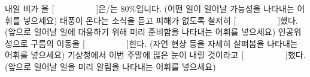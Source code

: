 \documentclass[fs11,seriesFre]{korfarm-base}
\begin{document}
\clearpage

\begin{kfChapterAreaList}
\end{kfChapterAreaList}



\kfActivityBg \par{}\par\nopagebreak[4]\smallskip\nopagebreak[4]
\begin{kfBlankList}
\kfBlankItem 내일 비가 올 [　　　　　]은/는 80\%입니다. (어떤 일이 일어날 가능성을 나타내는 어휘를 넣으세요)
\kfBlankItem 태풍이 온다는 소식을 듣고 피해가 없도록 철저히 [　　　　　]했다. (앞으로 일어날 일에 대응하기 위해 미리 준비함을 나타내는 어휘를 넣으세요)
\kfBlankItem 인공위성으로 구름의 이동을 [　　　　　]한다. (자연 현상 등을 자세히 살펴봄을 나타내는 어휘를 넣으세요)
\kfBlankItem 기상청에서 이번 주말에 많은 눈이 내릴 것이라고 [　　　　　]했다. (앞으로 일어날 일을 미리 알림을 나타내는 어휘를 넣으세요)
\end{kfBlankList}

\end{document}
